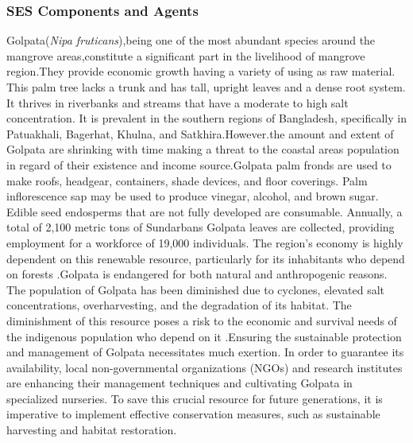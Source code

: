 \documentclass[final,5p,times,twocolumn,authoryear]{elsarticle}
\begin{document}
\subsubsection{SES Components and Agents}
Golpata(\textit{Nipa fruticans}),being one of the most abundant species around the mangrove areas,constitute a significant part in the livelihood of mangrove region.They provide economic growth having a variety of using as raw material\cite{jahan2006characterization}. This palm tree lacks a trunk and has tall, upright leaves and a dense root system. It thrives in riverbanks and streams that have a moderate to high salt concentration. It is prevalent in the southern regions of Bangladesh, specifically in Patuakhali, Bagerhat, Khulna, and Satkhira.However.the amount and extent of Golpata are shrinking with time making a threat to the coastal areas population in regard of their existence and income source\cite{financialexpress2020sundarbans}.Golpata palm fronds are used to make roofs, headgear, containers, shade devices, and floor coverings. Palm inflorescence sap may be used to produce vinegar, alcohol, and brown sugar. Edible seed endosperms that are not fully developed are consumable. Annually, a total of 2,100 metric tons of Sundarbans Golpata leaves are collected, providing employment for a workforce of 19,000 individuals. The region's economy is highly dependent on this renewable resource, particularly for its inhabitants who depend on forests \cite{mongabay2020}\cite{banglapedia2021}.Golpata is endangered for both natural and anthropogenic reasons. The population of Golpata has been diminished due to cyclones, elevated salt concentrations, overharvesting, and the degradation of its habitat. The diminishment of this resource poses a risk to the economic and survival needs of the indigenous population who depend on it \cite{mongabay2020}.Ensuring the sustainable protection and management of Golpata necessitates much exertion. In order to guarantee its availability, local non-governmental organizations (NGOs) and research institutes are enhancing their management techniques and cultivating Golpata in specialized nurseries. To save this crucial resource for future generations, it is imperative to implement effective conservation measures, such as sustainable harvesting and habitat restoration\cite{mongabay2020}.\vspace{0.5cm}
\end{document}
